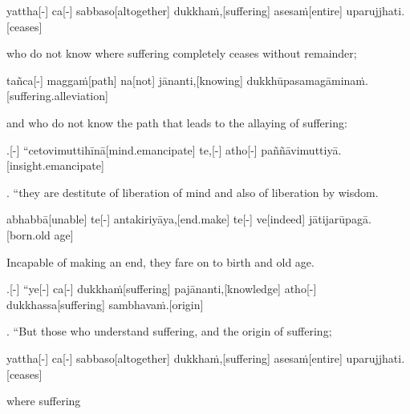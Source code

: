 \begin{samepage}
\begingl[glneveryline={\PaliGlossA,\PaliGlossB}]
yattha[-] ca[-] sabbaso[altogether] dukkhaṁ,[suffering] asesaṁ[entire] uparujjhati.[ceases]
\endgl
\nopagebreak
\linespread{0.5}
\begin{spacin}{0.2}
{\PaliGlossFT who do not know where suffering completely ceases without remainder;}
\end{spacin}
\vskip 12pt
\end{samepage}
\begin{samepage}
\begingl[glneveryline={\PaliGlossA,\PaliGlossB}]
tañca[-] maggaṁ[path] na[not] jānanti,[knowing] dukkhūpasamagāminaṁ.[suffering.alleviation]
\endgl
\nopagebreak
\linespread{0.5}
\begin{spacin}{0.2}
{\PaliGlossFT and who do not know the path that leads to the allaying of suffering:}
\end{spacin}
\vskip 12pt
\end{samepage}
\begin{samepage}
.[-] “cetovimuttihīnā[mind.emancipate] te,[-] atho[-] paññāvimuttiyā.[insight.emancipate]
\endgl
\nopagebreak
\linespread{0.5}
\begin{spacin}{0.2}
{. “they are destitute of liberation of mind  and also of liberation by wisdom.}
\end{spacin}
\vskip 12pt
\end{samepage}
\begin{samepage}
\begingl[glneveryline={\PaliGlossA,\PaliGlossB}]
abhabbā[unable] te[-] antakiriyāya,[end.make] te[-] ve[indeed] jātijarūpagā.[born.old age]
\endgl
\nopagebreak
\linespread{0.5}
\begin{spacin}{0.2}
{\PaliGlossFT Incapable of making an end, they fare on to birth and old age.}
\end{spacin}
\vskip 12pt
\end{samepage}
\begin{samepage}
.[-] “ye[-] ca[-] dukkhaṁ[suffering] pajānanti,[knowledge] atho[-] dukkhassa[suffering] sambhavaṁ.[origin]
\endgl
\nopagebreak
\linespread{0.5}
\begin{spacin}{0.2}
{. “But those who understand suffering,  and the origin of suffering;}
\end{spacin}
\vskip 12pt
\end{samepage}
\begin{samepage}
\begingl[glneveryline={\PaliGlossA,\PaliGlossB}]
yattha[-] ca[-] sabbaso[altogether] dukkhaṁ,[suffering] asesaṁ[entire] uparujjhati.[ceases]
\endgl
\nopagebreak
\linespread{0.5}
\begin{spacin}{0.2}
{ where suffering}
\end{spacin}
\vskip 12pt
\end{samepage}
